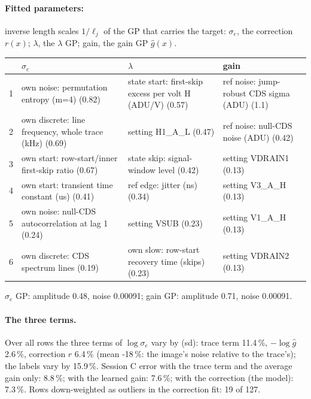 \paragraph{Fitted parameters:} inverse length scales $1/\ell_j$ of the GP that carries the target: $\sigma_e$, the correction $r(x)$; $\lambda$, the $\lambda$ GP; gain, the gain GP $\hat g(x)$.
\begin{center}\footnotesize
\begin{tabular}{rp{}p{}p{}}
\toprule
 & $\sigma_e$ & $\lambda$ & gain \\
\midrule
1 & own noise: permutation entropy (m=4) (0.82) & state start: first-skip excess per volt H (ADU/V) (0.57) & ref noise: jump-robust CDS sigma (ADU) (1.1) \\
2 & own discrete: line frequency, whole trace (kHz) (0.69) & setting H1\_A\_L (0.47) & ref noise: null-CDS noise (ADU) (0.42) \\
3 & own start: row-start/inner first-skip ratio (0.67) & state skip: signal-window level (0.42) & setting VDRAIN1 (0.13) \\
4 & own start: transient time constant (us) (0.41) & ref edge: jitter (ns) (0.34) & setting V3\_A\_H (0.13) \\
5 & own noise: null-CDS autocorrelation at lag 1 (0.24) & setting VSUB (0.23) & setting V1\_A\_H (0.13) \\
6 & own discrete: CDS spectrum lines (0.19) & own slow: row-start recovery time (skips) (0.23) & setting VDRAIN2 (0.13) \\
\bottomrule
\end{tabular}
\end{center}
{\footnotesize $\sigma_e$ GP: amplitude 0.48, noise 0.00091; gain GP: amplitude 0.71, noise 0.00091.}
\paragraph{The three terms.}
Over all rows the three terms of $\log\sigma_e$ vary by (sd): trace term 11.4\,\%, $-\log\hat g$ 2.6\,\%, correction $r$ 6.4\,\% (mean -18\,\%: the image's noise relative to the trace's); the labels vary by 15.9\,\%. Session C error with the trace term and the average gain only: 8.8\,\%; with the learned gain: 7.6\,\%; with the correction (the model): 7.3\,\%. Rows down-weighted as outliers in the correction fit: 19 of 127.
